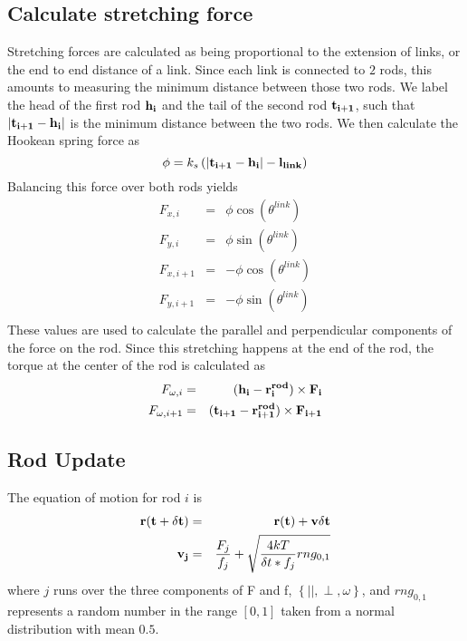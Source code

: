 \documentclass[11pt]{article}
\begin{document}
\subsection{Calculate stretching force}
Stretching forces are calculated as being proportional to the extension of links, or the end to end distance of a link. 
Since each link is connected to $2$ rods, this amounts to measuring the minimum distance between those two rods. We
label the head of the first rod $\bf{h}_{i}$ and the tail of the second rod $\bf{t}_{i+1}$, such that $|\bf{t}_{i+1} -
\bf{h}_i|$ is the minimum distance between the two rods. We then calculate the Hookean spring force as 
\begin{equation}
  \phi = k_s \left( |\bf{t}_{i+1}-\bf{h}_i|-l_{link} \right)
  \label{eqn:stretch}
\end{equation}
Balancing this force over both rods yields
\begin{eqnarray}
  F_{x,i} &=& \phi\cos{(\theta^{link})}\\\nonumber
  F_{y,i} &=& \phi\sin{(\theta^{link})}\\\nonumber
  F_{x,i+1} &=& -\phi\cos{(\theta^{link})}\\\nonumber
  F_{y,i+1} &=& -\phi\sin{(\theta^{link})}\\\nonumber
  \label{eqn:stretch_comp}
\end{eqnarray}
These values are used to calculate the parallel and perpendicular components of the force on the rod. Since this
stretching happens at the end of the rod, the torque at the center of the rod is calculated as
\begin{eqnarray}
  F_{\omega,i} &=& (\bf{h}_i-r^{rod}_i) \times \bf{F}_i\\\nonumber
  F_{\omega,i+1} &=& (\bf{t}_{i+1}-r^{rod}_{i+1}) \times \bf{F}_{i+1}
  \label{eqn:stretch_trq}
\end{eqnarray}
\subsection{Rod Update}
The equation of motion for rod $i$ is
\begin{eqnarray}
  \bf{r}(t+\delta t) &=& \bf{r}(t) + \bf{v} \delta t\\\nonumber
  \bf{v}_{j} &=& {F_{j}\over f_{j}} + \sqrt{{4kT\over \delta t*f_j}rng_{0,1}} 
  \label{eqn:motion}
\end{eqnarray}
where $j$ runs over the three components of F and f, $\left\{ ||, \perp, \omega\right\}$, and $rng_{0,1}$ represents a
random number in the range $\left[ 0,1 \right]$ taken from a normal distribution with mean $0.5$. 
\end{document}
